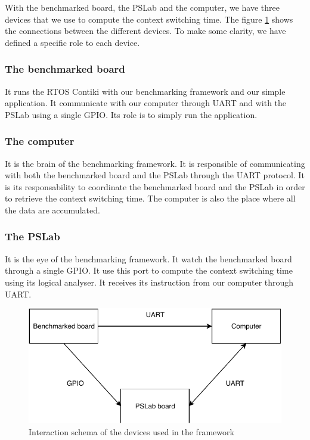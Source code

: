 With the benchmarked board, the PSLab and the computer, we have three devices that we use to compute the context switching time.
The figure \ref{fig:external-benchmarking-framework-schema} shows the connections between the different devices.
To make some clarity, we have defined a specific role to each device.

\subsubsection{The benchmarked board}
It runs the RTOS Contiki with our benchmarking framework and our simple application.
It communicate with our computer through UART and with the PSLab using a single GPIO.
Its role is to simply run the application.

\subsubsection{The computer}
It is the brain of the benchmarking framework.
It is responsible of communicating with both the benchmarked board and the PSLab through the UART protocol.
It is its responsability to coordinate the benchmarked board and the PSLab in order to retrieve the context switching time.
The computer is also the place where all the data are accumulated.

\subsubsection{The PSLab}
It is the eye of the benchmarking framework.
It watch the benchmarked board through a single GPIO.
It use this port to compute the context switching time using its logical analyser.
It receives its instruction from our computer through UART.

\begin{figure}[!ht]
  \centering
  \includegraphics[scale=1]{assets/external-benchmarking-framework-schema.pdf}
  \caption{\label{fig:external-benchmarking-framework-schema}Interaction schema of the devices used in the framework}
\end{figure}

